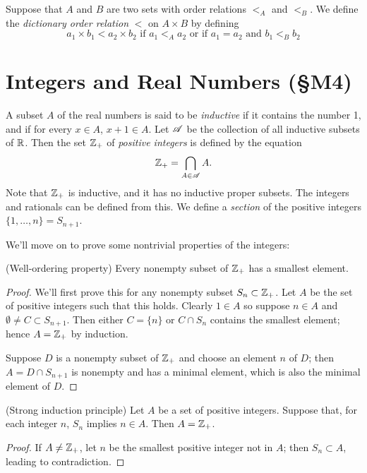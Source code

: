 \documentclass{report}
\begin{document}
\begin{definition}
  Suppose that $A$ and $B$ are two sets with order relations $<_A$ and $<_B$.
  We define the \emph{dictionary order relation} $<$ on $A \times B$ by defining
  \[
    a_1 \times b_1 < a_2 \times b_2 \text{ if } a_1 <_A a_2 \text{ or if } a_1 = a_2 \text{ and } b_1 <_B b_2
  \]
\end{definition}

\section{Integers and Real Numbers (\S M4)}
\begin{definition}
  A subset $A$ of the real numbers is said to be \emph{inductive} if it contains the number 1, and if for every $x \in A$, $x + 1 \in A$.
  Let $\mathscr{A}$ be the collection of all inductive subsets of $\mathbb{R}$. Then the set $\mathbb{Z}_+$ of \emph{positive integers} is defined by the equation
  \[
    \mathbb{Z}_+ = \bigcap_{A \in \mathscr{A}} A.
  \]
  Note that $\mathbb{Z}_+$ is inductive, and it has no inductive proper subsets.
  The integers and rationals can be defined from this.
  We define a \emph{section} of the positive integers $\{1,\dots,n\} = S_{n+1}$.
\end{definition}
We'll move on to prove some nontrivial properties of the integers:
\begin{theorem}
  {\normalfont (Well-ordering property)} Every nonempty subset of $\mathbb{Z}_+$ has a smallest element.
\end{theorem}
\begin{proof}
  We'll first prove this for any nonempty subset $S_n \subset \mathbb{Z}_+$.
  Let $A$ be the set of positive integers such that this holds.
  Clearly $1 \in A$ so suppose $n \in A$ and $\emptyset \neq C \subset S_{n+1}$.
  Then either $C = \{n\}$ or $C \cap S_n$ contains the smallest element;
  hence $A = \mathbb{Z}_+$ by induction.

  Suppose $D$ is a nonempty subset of $\mathbb{Z}_+$ and choose an element $n$ of $D$; then $A = D \cap S_{n+1}$ is nonempty and has a minimal element, which is also the  minimal element of $D$.
\end{proof}

\begin{theorem}
  {\normalfont (Strong induction principle)} Let $A$ be a set of positive integers. Suppose that, for each integer $n$, $S_n$ implies $n \in A$. Then $A = \mathbb{Z}_+$.
\end{theorem}
\begin{proof}  
If $A \neq \mathbb{Z}_+$, let $n$ be the smallest positive integer not in $A$; then $S_n \subset A$, leading to contradiction.
\end{proof}
\end{document}
